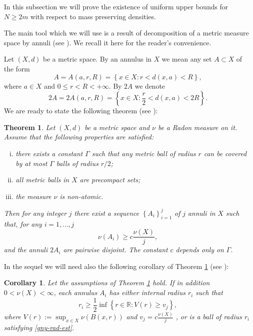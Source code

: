 \documentclass[11pt,a4paper]{amsart}
\numberwithin{equation}{section}
\newtheorem{thm}[equation]{Theorem}
\newtheorem{corollary}[equation]{Corollary}
\begin{document}
In this subsection we will prove the existence of uniform upper bounds for $N\ge 2m$ with respect to mass preserving densities.

The main tool which we will use is a result of decomposition of a metric measure space by annuli (see \cite[Theorem\,1.1]{gny}). We recall it here for the reader's convenience.

Let $(X,d)$ be a metric space. By an annulus in $X$ we mean any set $A\subset X$ of the form
\begin{equation*}
A=A(a,r,R)=\left\{x\in X:r<d(x,a)<R\right\},
\end{equation*}
where $a\in X$ and $0\leq r<R<+\infty$. By $2A$ we denote 
\begin{equation*}
2A=2A(a,r,R)=\left\{x\in X:\frac{r}{2}<d(x,a)<2R\right\}.
\end{equation*}
We are ready to state the following theorem (see \cite[Theorem\,11]{gny}):
\begin{thm}\label{gny}
Let $(X,d)$ be a metric space and $\nu$ be a Radon measure on it. Assume that the following properties are satisfied:
\begin{enumerate}[i)]
\item there exists a constant $\Gamma$ such that any metric ball of radius $r$ can be covered by at most $\Gamma$ balls of radius $r/2$;
\item all metric balls in $X$ are precompact sets;
\item the measure $\nu$ is non-atomic.
\end{enumerate}
Then for any integer $j$ there exist a sequence $\left\{A_i\right\}_{i=1}^j$ of $j$ annuli in $X$ such that, for any $i=1,...,j$
\begin{equation*}
\nu(A_i)\geq c\frac{\nu(X)}{j},
\end{equation*}
and the annuli $2A_i$ are pairwise disjoint. The constant $c$ depends only on $\Gamma$.
\end{thm}

In the sequel we will need also the following corollary of Theorem \ref{gny} (see \cite[Remark\,3.13]{gny}):

\begin{corollary}\label{corollarygny0}
Let the assumptions of Theorem \ref{gny} hold. If in addition $0<\nu(X)<\infty$, each annulus $A_i$ has either internal radius $r_i$ such that
\begin{equation}\label{gny-rad-est}
r_i\geq\frac{1}{2}\inf\left\{r\in\mathbb R:V(r)\geq v_j\right\},
\end{equation}
where $V(r):=\sup_{x\in X}\nu(B(x,r))$ and $v_j=c\frac{\nu(X)}{j}$ , or is a ball of radius $r_i$ satisfying \eqref{gny-rad-est}.
\end{corollary}
\end{document}
